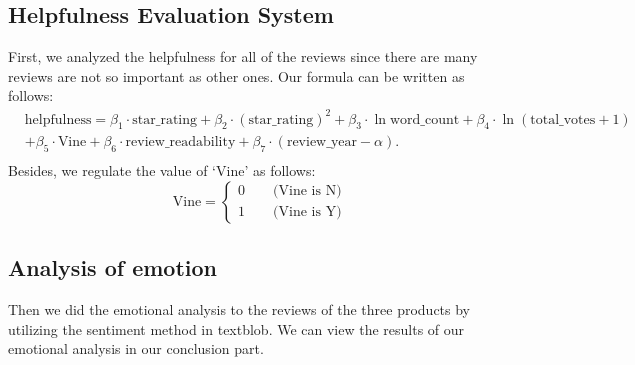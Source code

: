 \documentclass[12pt]{mcmthesis}
\begin{document}
\subsection{Helpfulness Evaluation System}
First, we analyzed the helpfulness for all of the reviews since there are many reviews are not so important as other ones. Our formula can be written as follows:
\begin{equation}
\begin{aligned}
&\text{helpfulness}=\beta_1\cdot\text{star\_rating}+\beta_2\cdot(\text{star\_rating})^2+\beta_3\cdot\ln{\text{word\_count}}+\beta_4\cdot\ln{(\text{total\_votes}+1)}\\
&+\beta_5\cdot\text{Vine}+\beta_6\cdot\text{review\_readability}+\beta_7\cdot(\text{review\_year}-\alpha).\\
\end{aligned}
\end{equation}
Besides, we regulate the value of `Vine' as follows:
$$\text{Vine}=\left\{\begin{aligned}
    0\qquad\text{(Vine is N)}\\
    1\qquad\text{(Vine is Y)}
\end{aligned}
\right .$$
\subsection{Analysis of emotion}
Then we did the emotional analysis to the reviews of the three products by utilizing the sentiment method in textblob. We can view the results of our emotional analysis in our conclusion part.
\end{document}
